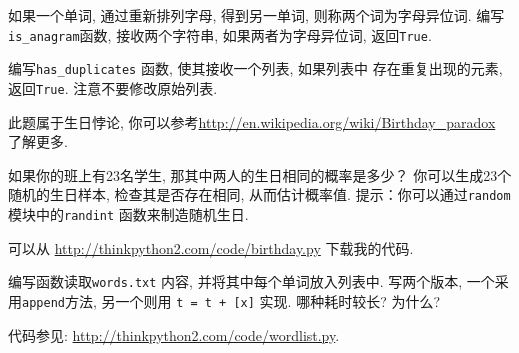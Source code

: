\documentclass[10pt]{book}
\begin{document}
\begin{exercise}
\label{anagram}

如果一个单词, 通过重新排列字母, 得到另一单词, 则称两个词为字母异位词. 
编写\verb"is_anagram"函数, 接收两个字符串, 如果两者为字母异位词, 返回{\tt True}.
\end{exercise}



\begin{exercise}
\label{duplicate}

编写\verb"has_duplicates" 函数, 使其接收一个列表, 如果列表中
存在重复出现的元素, 返回{\tt True}. 注意不要修改原始列表.

\end{exercise}


\begin{exercise}

此题属于生日悖论, 你可以参考\url{http://en.wikipedia.org/wiki/Birthday_paradox}
了解更多.

如果你的班上有23名学生, 那其中两人的生日相同的概率是多少？
你可以生成23个随机的生日样本, 检查其是否存在相同, 从而估计概率值. 
提示：你可以通过{\tt random}模块中的{\tt randint} 函数来制造随机生日. 

可以从 \url{http://thinkpython2.com/code/birthday.py} 下载我的代码.

\end{exercise}


\begin{exercise}

编写函数读取{\tt words.txt} 内容, 并将其中每个单词放入列表中. 
写两个版本, 一个采用{\tt append}方法, 另一个则用 {\tt t = t + [x]} 实现. 
哪种耗时较长? 为什么?

代码参见: \url{http://thinkpython2.com/code/wordlist.py}.

\end{exercise}
\end{document}
